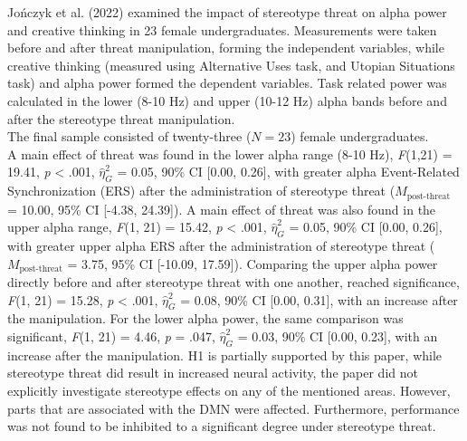 \documentclass[
  stu, a4paper, 12pt,mask,floatsintext]{apa7}
\begin{document}
Jończyk et al. (2022) examined the impact of stereotype threat on alpha power and creative thinking in 23 female undergraduates.
Measurements were taken before and after threat manipulation, forming the independent variables, while creative thinking (measured using Alternative Uses task, and Utopian Situations task) and alpha power formed the dependent variables.
Task related power was calculated in the lower (8-10 Hz) and upper (10-12 Hz) alpha bands before and after the stereotype threat manipulation.\\
The final sample consisted of twenty-three (\(N = 23\)) female undergraduates.\\
A main effect of threat was found in the lower alpha range (8-10 Hz), \emph{F}(1,21) = 19.41, \emph{p} \textless{} .001, \(\hat{\eta}^{2}_{G}\) = 0.05, 90\% CI {[}0.00, 0.26{]}, with greater alpha Event-Related Synchronization (ERS) after the administration of stereotype threat (\(M_{\text{post-threat}}\) = 10.00, 95\% CI {[}-4.38, 24.39{]}).
A main effect of threat was also found in the upper alpha range, \emph{F}(1, 21) = 15.42, \emph{p} \textless{} .001, \(\hat{\eta}^{2}_{G}\) = 0.05, 90\% CI {[}0.00, 0.26{]}, with greater upper alpha ERS after the administration of stereotype threat (\(M_{\text{post-threat}}\) = 3.75, 95\% CI {[}-10.09, 17.59{]}).
Comparing the upper alpha power directly before and after stereotype threat with one another, reached significance, \emph{F}(1, 21) = 15.28, \emph{p} \textless{} .001, \(\hat{\eta}^{2}_{G}\) = 0.08, 90\% CI {[}0.00, 0.31{]}, with an increase after the manipulation.
For the lower alpha power, the same comparison was significant, \emph{F}(1, 21) = 4.46, \emph{p} = .047, \(\hat{\eta}^{2}_{G}\) = 0.03, 90\% CI {[}0.00, 0.23{]}, with an increase after the manipulation.
H1 is partially supported by this paper, while stereotype threat did result in increased neural activity, the paper did not explicitly investigate stereotype effects on any of the mentioned areas. However, parts that are associated with the DMN were affected. Furthermore, performance was not found to be inhibited to a significant degree under stereotype threat.
\end{document}

